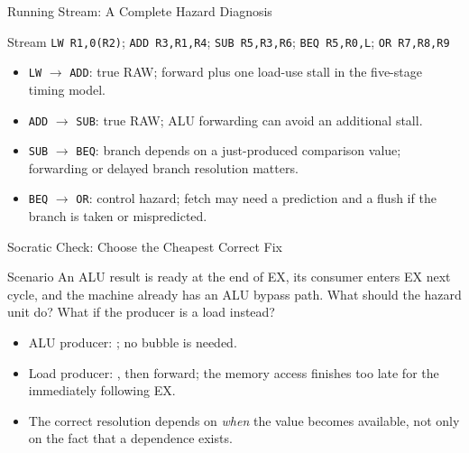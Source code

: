 \documentclass[aspectratio=169]{beamer}
\begin{document}
\begin{frame}{Running Stream: A Complete Hazard Diagnosis}
  \scriptsize
  \begin{exampleblock}{Stream}
    \texttt{LW R1,0(R2)}; \texttt{ADD R3,R1,R4}; \texttt{SUB R5,R3,R6};
    \texttt{BEQ R5,R0,L}; \texttt{OR R7,R8,R9}
  \end{exampleblock}
  \begin{itemize}
    \item \texttt{LW} $\to$ \texttt{ADD}: true RAW; forward plus one load-use
      stall in the five-stage timing model.
    \item \texttt{ADD} $\to$ \texttt{SUB}: true RAW; ALU forwarding can avoid
      an additional stall.
    \item \texttt{SUB} $\to$ \texttt{BEQ}: branch depends on a just-produced
      comparison value; forwarding or delayed branch resolution matters.
    \item \texttt{BEQ} $\to$ \texttt{OR}: control hazard; fetch may need a
      prediction and a flush if the branch is taken or mispredicted.
  \end{itemize}
\end{frame}

\begin{frame}{Socratic Check: Choose the Cheapest Correct Fix}
  \begin{alertblock}{Scenario}
    An ALU result is ready at the end of EX, its consumer enters EX next cycle,
    and the machine already has an ALU bypass path. What should the hazard unit
    do? What if the producer is a load instead?
  \end{alertblock}
  \begin{itemize}
    \item ALU producer: ; no bubble is needed.
    \item Load producer: , then forward;
      the memory access finishes too late for the immediately following EX.
    \item The correct resolution depends on \emph{when} the value becomes
      available, not only on the fact that a dependence exists.
  \end{itemize}
\end{frame}
\end{document}
